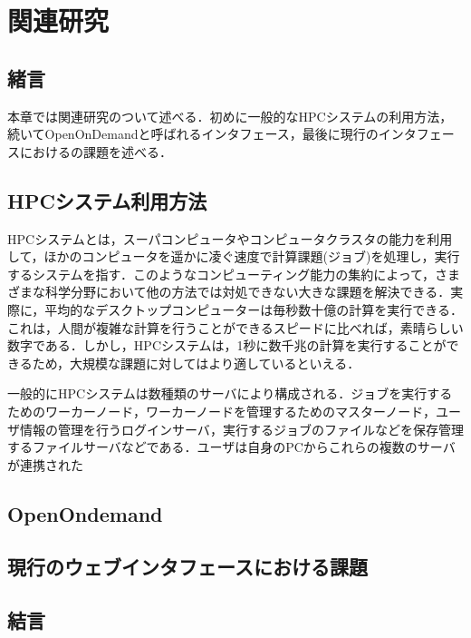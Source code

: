 
\section{関連研究}

\subsection{緒言}
本章では関連研究のついて述べる．初めに一般的なHPCシステムの利用方法，続いてOpenOnDemandと呼ばれるインタフェース，最後に現行のインタフェースにおけるの課題を述べる．

\subsection{HPCシステム利用方法}
HPCシステムとは，スーパコンピュータやコンピュータクラスタの能力を利用して，ほかのコンピュータを遥かに凌ぐ速度で計算課題(ジョブ)を処理し，実行するシステムを指す．このようなコンピューティング能力の集約によって，さまざまな科学分野において他の方法では対処できない大きな課題を解決できる．実際に，平均的なデスクトップコンピューターは毎秒数十億の計算を実行できる．これは，人間が複雑な計算を行うことができるスピードに比べれば，素晴らしい数字である．しかし，HPCシステムは，1秒に数千兆の計算を実行することができるため，大規模な課題に対してはより適しているといえる．\par
一般的にHPCシステムは数種類のサーバにより構成される．ジョブを実行するためのワーカーノード，ワーカーノードを管理するためのマスターノード，ユーザ情報の管理を行うログインサーバ，実行するジョブのファイルなどを保存管理するファイルサーバなどである．ユーザは自身のPCからこれらの複数のサーバが連携された

\subsection{OpenOndemand}

\subsection{現行のウェブインタフェースにおける課題}

\subsection{結言}
